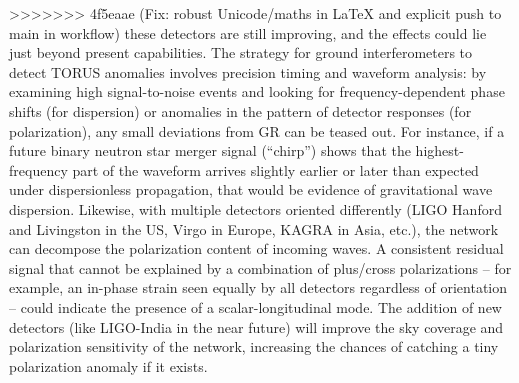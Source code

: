 \documentclass[]{article}
\begin{document}
>>>>>>> 4f5eaae (Fix: robust Unicode/maths in LaTeX and explicit push to main in workflow)
these detectors are still improving, and the effects could lie just
beyond present capabilities​. The strategy for ground interferometers to
detect TORUS anomalies involves precision timing and waveform analysis:
by examining high signal-to-noise events and looking for
frequency-dependent phase shifts (for dispersion) or anomalies in the
pattern of detector responses (for polarization), any small deviations
from GR can be teased out. For instance, if a future binary neutron star
merger signal (``chirp'') shows that the highest-frequency part of the
waveform arrives slightly earlier or later than expected under
dispersionless propagation, that would be evidence of gravitational wave
dispersion. Likewise, with multiple detectors oriented differently (LIGO
Hanford and Livingston in the US, Virgo in Europe, KAGRA in Asia, etc.),
the network can decompose the polarization content of incoming waves. A
consistent residual signal that cannot be explained by a combination of
plus/cross polarizations -- for example, an in-phase strain seen equally
by all detectors regardless of orientation -- could indicate the
presence of a scalar-longitudinal mode. The addition of new detectors
(like LIGO-India in the near future) will improve the sky coverage and
polarization sensitivity of the network, increasing the chances of
catching a tiny polarization anomaly if it exists​.
\end{document}
